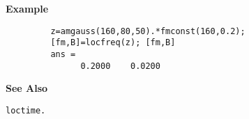 \vspace*{1cm}

{\bf \large {}\selectfont Example}
\begin{verbatim}
         z=amgauss(160,80,50).*fmconst(160,0.2);
         [fm,B]=locfreq(z); [fm,B]
         ans = 
               0.2000    0.0200
\end{verbatim}
\vspace*{.5cm}


{\bf \large {}\selectfont See Also}\\
\hspace*{1.5cm}
\begin{minipage}[t]{13.5cm}
\begin{verbatim}
loctime.
\end{verbatim}
\end{minipage}




